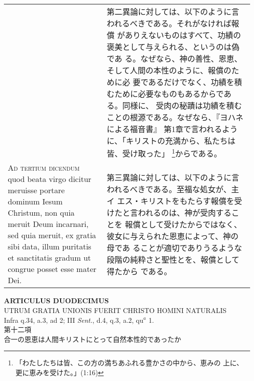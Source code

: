 \documentclass[10pt]{jsarticle} %
\begin{document}
\begin{longtable}{p{21em}p{21em}}
&

第二異論に対しては、以下のように言われるべきである。それがなければ報償
がありえないものはすべて、功績の褒美として与えられる、というのは偽であ
る。なぜなら、神の善性、恩恵、そして人間の本性のように、報償のために必
要であるだけでなく、功績を積むために必要なものもあるからである。同様に、
受肉の秘蹟は功績を積むことの根源である。なぜなら、『ヨハネによる福音書』
第1章で言われるように、「キリストの充満から、私たちは皆、受け取った」
\footnote{「わたしたちは皆、この方の満ちあふれる豊かさの中から、恵みの
上に、更に恵みを受けた。」(1:16)}からである。


\\



{\scshape Ad tertium dicendum} quod beata virgo dicitur meruisse
portare dominum Iesum Christum, non quia meruit Deum incarnari, sed
quia meruit, ex gratia sibi data, illum puritatis et sanctitatis
gradum ut congrue posset esse mater Dei.


&


第三異論に対しては、以下のように言われるべきである。至福な処女が、主イ
エス・キリストをもたらす報償を受けたと言われるのは、神が受肉することを
報償として受けたからではなく、彼女に与えられた恩恵によって、神の母であ
ることが適切でありうるような段階の純粋さと聖性とを、報償として得たから
である。

\\


\end{longtable}
\newpage




\begin{center}
{\Large {\bf ARTICULUS DUODECIMUS}}\\ {\large UTRUM GRATIA UNIONIS
FUERIT CHRISTO HOMINI NATURALIS}\\ {\footnotesize Infra q.34, a.3, ad
2; III {\itshape Sent.}, d.4, q.3, a.2, qu$^a$ 1.}\\ {\Large 第十二項
\\合一の恩恵は人間キリストにとって自然本性的であったか}
\end{center}
\end{document}
